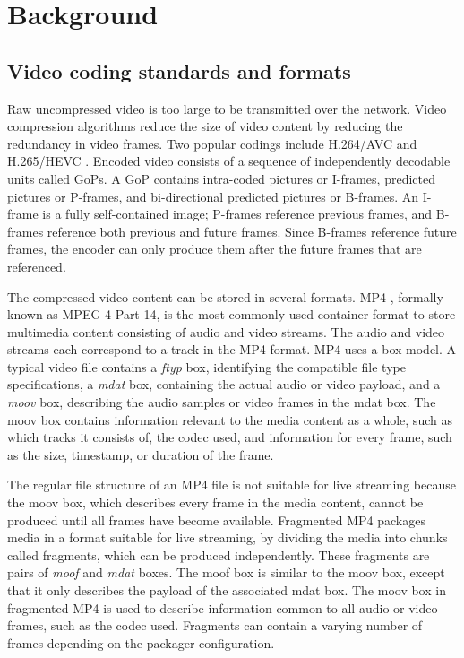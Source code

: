 
\chapter{Background}\label{chapter:background}

\section{Video coding standards and formats}
Raw uncompressed video is too large to be transmitted over the network. Video compression algorithms reduce the size of video content by reducing the redundancy in video frames. Two popular codings include H.264/AVC \parencite{wiegandOverview264AVC2003} and H.265/HEVC \parencite{sullivanOverviewHighEfficiency2012}. Encoded video consists of a sequence of independently decodable units called \acp{GoP}. A \ac{GoP} contains intra-coded pictures or I-frames, predicted pictures or P-frames, and bi-directional predicted pictures or B-frames. An I-frame is a fully self-contained image; P-frames reference previous frames, and B-frames reference both previous and future frames. Since B-frames reference future frames, the encoder can only produce them after the future frames that are referenced.


The compressed video content can be stored in several formats. MP4 \parencite{mpeg-4part14MPEG4MP4File}, formally known as MPEG-4 Part 14, is the most commonly used container format to store multimedia content consisting of audio and video streams. The audio and video streams each correspond to a track in the MP4 format. MP4 uses a box model. A typical video file contains a \textit{ftyp} box, identifying the compatible file type specifications, a \textit{mdat} box, containing the actual audio or video payload, and a \textit{moov} box, describing the audio samples or video frames in the mdat box. The moov box contains information relevant to the media content as a whole, such as which tracks it consists of, the codec used, and information for every frame, such as the size, timestamp, or duration of the frame.

The regular file structure of an MP4 file is not suitable for live streaming because the moov box, which describes every frame in the media content, cannot be produced until all frames have become available. Fragmented MP4 packages media in a format suitable for live streaming, by dividing the media into chunks called fragments, which can be produced independently. These fragments are pairs of \textit{moof} and \textit{mdat} boxes. The moof box is similar to the moov box, except that it only describes the payload of the associated mdat box. The moov box in fragmented MP4 is used to describe information common to all audio or video frames, such as the codec used. Fragments can contain a varying number of frames depending on the packager configuration.

